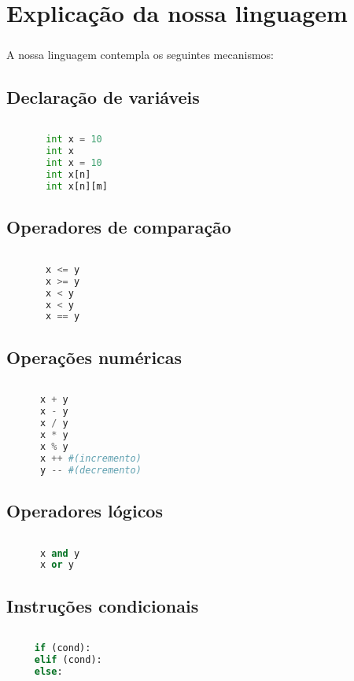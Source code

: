 \documentclass[11pt,a4paper]{report}
\begin{document}
    \chapter{Explicação da nossa linguagem}
    \paragraph{}
    A nossa linguagem contempla os seguintes mecanismos:
    \section{Declaração de variáveis}
    \begin{lstlisting}[language=Python]
    
       int x = 10
       int x
       int x = 10
       int x[n]
       int x[n][m]
    \end{lstlisting}
    \section{Operadores de comparação}
    \begin{lstlisting}[language=Python]
    
       x <= y
       x >= y
       x < y
       x < y
       x == y
    \end{lstlisting}
    \section{Operações numéricas}
    \begin{lstlisting}[language=Python]
    
      x + y
      x - y
      x / y
      x * y
      x % y
      x ++ #(incremento)
      y -- #(decremento)
    \end{lstlisting}
      \section{Operadores lógicos}
    \begin{lstlisting}[language=Python]
    
      x and y
      x or y
    \end{lstlisting}
    \section{Instruções condicionais}
    \begin{lstlisting}[language=Python]
    
     if (cond):
     elif (cond):
     else:
     \end{lstlisting}
\end{document}
